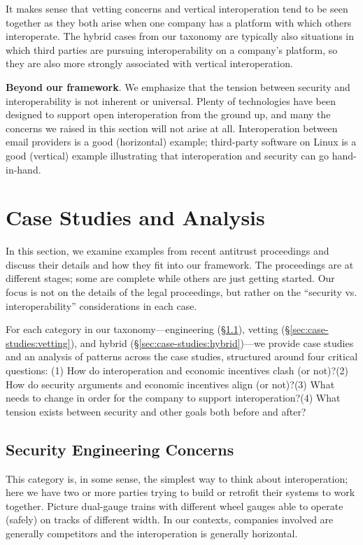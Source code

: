 \documentclass[letterpaper,twocolumn,10pt]{article}
\newcommand{\subh}[1]{\smallskip \noindent \textbf{{#1}}.}
\renewcommand{\paragraph}[1]{\subh{#1}}
\newcommand{\qone}{How do interoperation and economic incentives clash
(or not)?\xspace}
\newcommand{\qtwo}{How do security arguments and economic incentives align (or not)?\xspace}
\newcommand{\qthree}{What needs to change in order for the company to support interoperation?\xspace}
\newcommand{\qfour}{What tension exists between security and other goals
both before and after?\xspace}
\begin{document}
It makes sense that vetting concerns and vertical interoperation tend to be seen together as they both arise when one company has a platform with which others interoperate. The hybrid cases from our taxonomy are typically also situations in which third parties are pursuing interoperability on a company's platform, so they are also more strongly associated with vertical interoperation.

\paragraph{Beyond our framework}
We emphasize that the tension between security and interoperability is not inherent or universal. Plenty of technologies have been designed to support open interoperation from the ground up, and many the concerns we raised in this section will not arise at all. Interoperation between email providers is a good (horizontal) example; third-party software on Linux is a good (vertical) example illustrating that interoperation and security can go hand-in-hand. 

\section{Case Studies and Analysis}
\label{sec:case-studies}

In this section, we examine examples from recent antitrust proceedings and discuss their details and how they fit into our framework.  The proceedings are at different stages; some are complete while others are just getting started. Our focus is not on the details of the legal proceedings, but rather on the ``security vs. interoperability'' considerations in each case.  

For each category in our taxonomy---engineering (\S\ref{sec:case-studies:engineering}), vetting (\S\ref{sec:case-studies:vetting}), and hybrid (\S\ref{sec:case-studies:hybrid})---we provide case studies and an analysis of patterns across the case studies, structured around four critical questions: (1) \qone (2) \qtwo (3) \qthree (4) \qfour

\subsection{Security Engineering Concerns}
\label{sec:case-studies:engineering}
This category is, in some sense, the simplest way to think about interoperation; here we have two or more  parties trying to build or retrofit their systems to work together. Picture dual-gauge trains with different wheel gauges able to operate (safely) on tracks of different width.  In our contexts, companies involved are generally competitors and the interoperation is generally horizontal.
\end{document}
